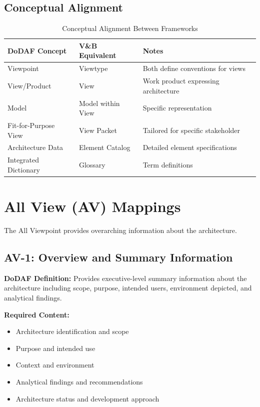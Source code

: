 \documentclass[11pt]{article}
\begin{document}
\subsection{Conceptual Alignment}

\begin{longtable}{@{}L{4cm} L{4cm} L{4.5cm}@{}}
\caption{Conceptual Alignment Between Frameworks} \\
\toprule
\textbf{DoDAF Concept} & \textbf{V\&B Equivalent} & \textbf{Notes} \\
\midrule
\endfirsthead
\bottomrule
\endlastfoot
Viewpoint & Viewtype & Both define conventions for views \\
View/Product & View & Work product expressing architecture \\
Model & Model within View & Specific representation \\
Fit-for-Purpose View & View Packet & Tailored for specific stakeholder \\
Architecture Data & Element Catalog & Detailed element specifications \\
Integrated Dictionary & Glossary & Term definitions \\
\end{longtable}

\section{All View (AV) Mappings}

The All Viewpoint provides overarching information about the architecture.

\subsection{AV-1: Overview and Summary Information}

\begin{dodafbox}
\textbf{DoDAF Definition:} Provides executive-level summary information about the architecture including scope, purpose, intended users, environment depicted, and analytical findings.

\textbf{Required Content:}
\begin{itemize}[nosep]
    \item Architecture identification and scope
    \item Purpose and intended use
    \item Context and environment
    \item Analytical findings and recommendations
    \item Architecture status and development approach
\end{itemize}
\end{dodafbox}
\end{document}
